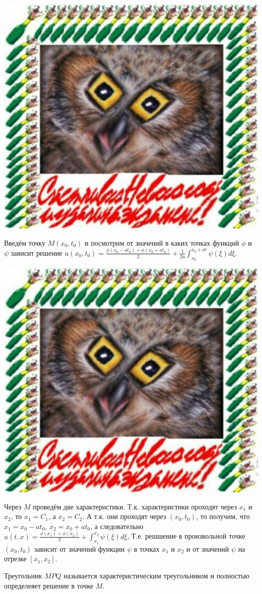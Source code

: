 \documentclass[../main.tex]{subfiles}
\begin{document}
\includegraphics[scale=0.5]{example.jpg}  

Введём точку $M(x_0, t_0)$ и посмотрим от значений в каких точках функций 
$\phi$ и $\psi$ зависит решение $u(x_0, t_0) = \frac{\phi(x_0-at_0) + \phi(x_0+at_0)}{2} + \frac{1}{2a}\int_{x_0}^{x_0+at}\psi(\xi)d\xi$.

\includegraphics[scale=0.5]{example.jpg} 

Через $M$ проведём две характеристики. Т.к. характеристики проходят через
$x_1$ и $x_2$, то $x_1 = C_1$, а $x_2 = C_2$.
А т.к. они проходят через $(x_0, t_0)$, то получим, что $x_1 = x_0 -at_0$, $x_2 = x_0 + at_0$,
а следовательно $u(t, x) = \frac{\phi(x_1) + \phi(x_2)}{2} + \int_{x_1}^{x_2}\psi(\xi)d\xi$,
Т.е. решшение в произвольной точке $(x_0, t_0)$ зависит от значений функции $\psi$ 
в точках $x_1$ и $x_2$ и от значений $\psi$ на отрезке $[x_1, x_2]$.

Треугольник $MPQ$ называется характеристическим треугольником и полностью определеяет решение в точке $M$.
\end{document}
